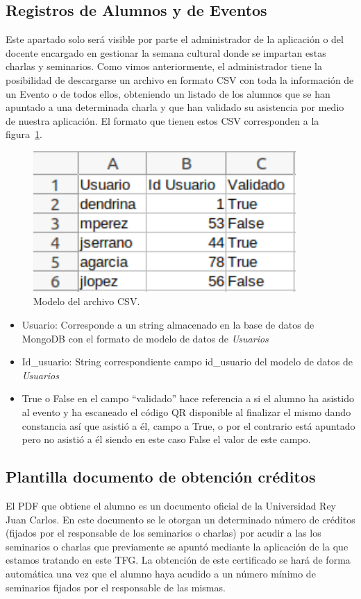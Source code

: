 \documentclass[a4paper, 12pt]{book}
\begin{document}
\subsection{Registros de Alumnos y de Eventos}
	Este apartado solo será visible por parte el administrador de la aplicación o del docente encargado en gestionar la semana cultural donde se impartan estas charlas y seminarios. Como vimos anteriormente, el administrador tiene la posibilidad de descargarse un archivo en formato CSV con toda la información de un Evento o de todos ellos, obteniendo un listado de los alumnos que se han apuntado a una determinada charla y que han validado su asistencia por medio de nuestra aplicación.
	El formato que tienen estos CSV corresponden a la figura~\ref{fig:CSVAlumnos}.
	\begin{figure}[h!]
  	\centering
  	\includegraphics[width=10cm, keepaspectratio]{img/CSVAlumnos.png}
  	\caption{Modelo del archivo CSV.}\label{fig:CSVAlumnos}
	\end{figure}
	\begin{itemize}
		\item Usuario: Corresponde a un string almacenado en la base de datos de MongoDB con el formato de modelo de datos de \textit{Usuarios}
		\item Id\_usuario: String correspondiente campo id\_usuario del modelo de datos de \textit{Usuarios}
		\item True o False en el campo ``validado'' hace referencia a si el alumno ha asistido al evento y ha escaneado el código QR disponible al finalizar el mismo dando constancia así que asistió a él, campo a True, o por el contrario está apuntado pero no asistió a él siendo en este caso False el valor de este campo.
	\end{itemize}
	

\subsection{Plantilla documento de obtención créditos}
	El PDF que obtiene el alumno es un documento oficial de la Universidad Rey Juan Carlos. En este documento se le otorgan un determinado número de créditos (fijados por el responsable de los seminarios o charlas) por acudir a las los seminarios o charlas que previamente se apuntó mediante la aplicación de la que estamos tratando en este TFG. La obtención de este certificado se hará de forma automática una vez que el alumno haya acudido a un número mínimo de seminarios fijados por el responsable de las mismas. 
\end{document}
